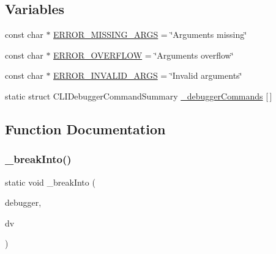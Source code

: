\subsection*{Variables}
\begin{DoxyCompactItemize}
\item 
const char $\ast$ \mbox{\hyperlink{debugger_2cli-debugger_8c_a9383b9ccd0a465e305a5132bb1c24fe1}{E\+R\+R\+O\+R\+\_\+\+M\+I\+S\+S\+I\+N\+G\+\_\+\+A\+R\+GS}} = \char`\"{}Arguments missing\char`\"{}
\item 
const char $\ast$ \mbox{\hyperlink{debugger_2cli-debugger_8c_aef2690a57fa9a85d0c8c25aca30b88cd}{E\+R\+R\+O\+R\+\_\+\+O\+V\+E\+R\+F\+L\+OW}} = \char`\"{}Arguments overflow\char`\"{}
\item 
const char $\ast$ \mbox{\hyperlink{debugger_2cli-debugger_8c_a9ffa083a9ebdc0a00f1a8dc9314e269d}{E\+R\+R\+O\+R\+\_\+\+I\+N\+V\+A\+L\+I\+D\+\_\+\+A\+R\+GS}} = \char`\"{}Invalid arguments\char`\"{}
\item 
static struct C\+L\+I\+Debugger\+Command\+Summary \mbox{\hyperlink{debugger_2cli-debugger_8c_a3c6f5f79f16164bd29e68ea0d7ddab2a}{\+\_\+debugger\+Commands}} \mbox{[}$\,$\mbox{]}
\end{DoxyCompactItemize}


\subsection{Function Documentation}
\mbox{\label{debugger_2cli-debugger_8c_ae3b40515b8220fab94d8b674d572a630}} 
\subsubsection{\texorpdfstring{\+\_\+break\+Into()}{\_breakInto()}}
{\footnotesize\ttfamily static void \+\_\+break\+Into (\begin{DoxyParamCaption}\item[{struct C\+L\+I\+Debugger $\ast$}]{debugger,  }\item[{struct C\+L\+I\+Debug\+Vector $\ast$}]{dv }\end{DoxyParamCaption})\hspace{0.3cm}{\ttfamily [static]}}

